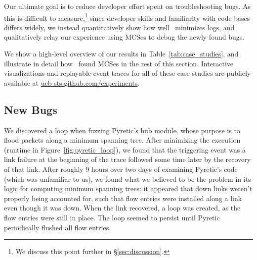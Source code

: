 Our ultimate goal is to reduce developer effort spent on troubleshooting bugs.
As this is difficult to measure,\footnote{We discuss this point further in
\S\ref{sec:discussion}.} since developer skills and
familiarity with code bases differs widely, we instead
quantitatively show how well \projectname~minimizes logs,
and qualitatively relay our experience using MCSes to debug the newly found bugs.


We show a high-level overview
of our results in Table~\ref{tab:case_studies}, and
illustrate in detail how \projectname~found MCSes
in the rest of this section. Interactive visualizations and replayable event traces
for all of these case studies are publicly available at
\href{http://ucb-sts.github.com/experiments}{ucb-sts.github.com/experiments}.

\subsection{New Bugs}

 We discovered a loop when fuzzing Pyretic's hub
module, whose purpose is to flood packets along a minimum spanning tree. After
minimizing the execution (runtime in Figure~\ref{fig:pyretic_loop}), we found that the triggering event
was a link failure at the beginning of the trace followed some time later by
the recovery of that link. After roughly 9 hours over two days of examining
Pyretic's code (which was unfamiliar to us), we found what we believed to be the problem
in its logic for computing minimum spanning trees: it appeared that down links
weren't properly being accounted for, such that flow entries were installed
along a link even though it was down. When the link recovered, a loop was
created, as the flow entries were still in place. The loop seemed to persist until
Pyretic periodically flushed all flow entries.

